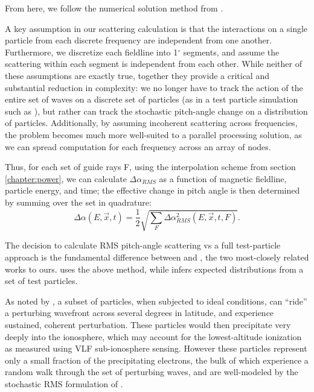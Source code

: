 From here, we follow the numerical solution method from \cite{Bortnik2005, Bortnik2006}. 

A key assumption in our scattering calculation is that the interactions on a single particle from each discrete frequency are independent from one another. Furthermore, we discretize each fieldline into 1$^\circ$ segments, and assume the scattering within each segment is independent from each other. While neither of these assumptions are exactly true, together they provide a critical and substantial reduction in complexity: we no longer have to track the action of the entire set of waves on a discrete set of particles (as in a test particle simulation such as \cite{Chang1985}), but rather can track the stochastic pitch-angle change on a distribution of particles. Additionally, by assuming incoherent scattering across frequencies, the problem becomes much more well-suited to a parallel processing solution, as we can spread computation for each frequency across an array of nodes.

Thus, for each set of guide rays F, using the interpolation scheme from section \ref{chapter:power}, we can calculate $\Delta \alpha_{RMS}$ as a function of magnetic fieldline, particle energy, and time; the effective change in pitch angle is then determined by summing over the set in quadrature: 
\begin{equation}
\Delta \alpha(E, \vec{x}, t) = \frac{1}{2}\sqrt{\sum_{F} \Delta \alpha_{RMS}^2(E, \vec{x},t, F)}.
\end{equation}

The decision to calculate RMS pitch-angle scattering vs a full test-particle approach is the fundamental difference between \cite{Lauben1998} and \cite{Bortnik2005}, the two most-closely related works to ours. \citeauthor{Bortnik2006} uses the above method, while \citeauthor{Lauben1998} infers expected distributions from a set of test particles. 

As noted by \cite{Lauben1998, Lauben2001}, a subset of particles, when subjected to ideal conditions, can ``ride'' a perturbing wavefront across several degrees in latitude, and experience sustained, coherent perturbation. These particles would then precipitate very deeply into the ionosphere, which may account for the lowest-altitude ionization as measured using VLF sub-ionosphere sensing. However these particles represent only a small fraction of the precipitating electrons, the bulk of which experience a random walk through the set of perturbing waves, and are well-modeled by the stochastic RMS formulation of \citeauthor{Bortnik2005}.

